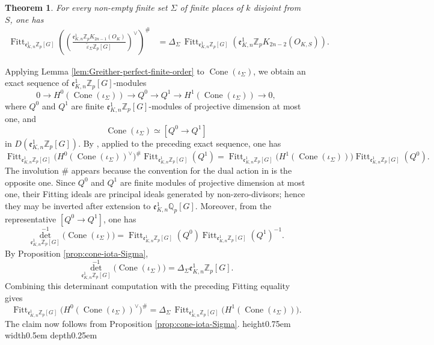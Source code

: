 \documentclass[a4paper,11pt]{article}
\newtheorem{theorem}{Theorem}[section]
\newenvironment{proof}[1][Proof]{\begin{trivlist}
\item[\hskip \labelsep {\bfseries #1}]}{\end{trivlist}}
\newcommand{\qed}{\nobreak \ifvmode \relax \else
    \ifdim\lastskip<1.5em \hskip-\lastskip
     \hskip1.5em plus0em minus0.5em \fi \nobreak
      \vrule height0.75em width0.5em depth0.25em\fi}
\begin{document}
\begin{theorem}
\label{thm:Fitting-relation-cone-Sigma}
For every non-empty finite set $\Sigma$ of finite places of $k$ disjoint from
$S$, one has
\[
\begin{aligned}
\operatorname{Fitt}_{\mathfrak e^1_{K,n}\mathbb Z_p[G]}
\left(
\left(
\frac{
\mathfrak e^1_{K,n}\mathbb Z_pK_{2n-1}(O_K)
}{
\widetilde\varepsilon_{\Sigma}\mathbb Z_p[G]
}
\right)^{\vee}
\right)^\#
&=
\Delta_{\Sigma}\,
\operatorname{Fitt}_{\mathfrak e^1_{K,n}\mathbb Z_p[G]}
\left(
\mathfrak e^1_{K,n}\mathbb Z_pK_{2n-2}(O_{K,S})
\right).
\end{aligned}
\]
\end{theorem}

\begin{proof}
Applying Lemma \ref{lem:Greither-perfect-finite-order} to
\(\operatorname{Cone}(\iota_{\Sigma})\), we obtain an exact sequence of
\(\mathfrak e^1_{K,n}\mathbb Z_p[G]\)-modules
\[
0
\longrightarrow
H^0(\operatorname{Cone}(\iota_{\Sigma}))
\longrightarrow
Q^0
\longrightarrow
Q^1
\longrightarrow
H^1(\operatorname{Cone}(\iota_{\Sigma}))
\longrightarrow
0,
\]
where \(Q^0\) and \(Q^1\) are finite
\(\mathfrak e^1_{K,n}\mathbb Z_p[G]\)-modules of projective dimension at most
one, and
\[
\operatorname{Cone}(\iota_{\Sigma})
\simeq
[Q^0\longrightarrow Q^1]
\]
in \(D(\mathfrak e^1_{K,n}\mathbb Z_p[G])\).
By \cite[Lemma 5]{BunsG0}, applied to the preceding exact sequence, one has
\[
\operatorname{Fitt}_{\mathfrak e^1_{K,n}\mathbb Z_p[G]}
\bigl(
H^0(\operatorname{Cone}(\iota_{\Sigma}))^\vee
\bigr)^\#
\operatorname{Fitt}_{\mathfrak e^1_{K,n}\mathbb Z_p[G]}(Q^1)
=
\operatorname{Fitt}_{\mathfrak e^1_{K,n}\mathbb Z_p[G]}
\bigl(
H^1(\operatorname{Cone}(\iota_{\Sigma}))
\bigr)
\operatorname{Fitt}_{\mathfrak e^1_{K,n}\mathbb Z_p[G]}(Q^0).
\]
The involution \(\#\) appears
because the convention for the dual action in \cite[Lemma 5]{BunsG0} is the
opposite one.
Since \(Q^0\) and \(Q^1\) are finite modules of projective dimension at most one, their
Fitting ideals are principal ideals generated by non-zero-divisors; hence they
may be inverted after extension to
\(\mathfrak e^1_{K,n}\mathbb Q_p[G]\). Moreover, from the representative
\([Q^0\to Q^1]\), one has
\[
\operatorname{det}^{-1}_{\mathfrak e^1_{K,n}\mathbb Z_p[G]}
\bigl(\operatorname{Cone}(\iota_{\Sigma})\bigr)
=
\operatorname{Fitt}_{\mathfrak e^1_{K,n}\mathbb Z_p[G]}(Q^0)
\operatorname{Fitt}_{\mathfrak e^1_{K,n}\mathbb Z_p[G]}(Q^1)^{-1}.
\]
By Proposition \ref{prop:cone-iota-Sigma},
\[
\operatorname{det}^{-1}_{\mathfrak e^1_{K,n}\mathbb Z_p[G]}
\bigl(\operatorname{Cone}(\iota_{\Sigma})\bigr)
=
\Delta_{\Sigma}\mathfrak e^1_{K,n}\mathbb Z_p[G].
\]
Combining this determinant computation with the preceding Fitting equality gives
\[
\operatorname{Fitt}_{\mathfrak e^1_{K,n}\mathbb Z_p[G]}
\bigl(H^0(\operatorname{Cone}(\iota_{\Sigma}))^{\vee}\bigr)^\#
=
\Delta_{\Sigma}\,
\operatorname{Fitt}_{\mathfrak e^1_{K,n}\mathbb Z_p[G]}
\bigl(H^1(\operatorname{Cone}(\iota_{\Sigma}))\bigr).
\]
The claim now follows from Proposition \ref{prop:cone-iota-Sigma}.\qed
\end{proof}
\end{document}
